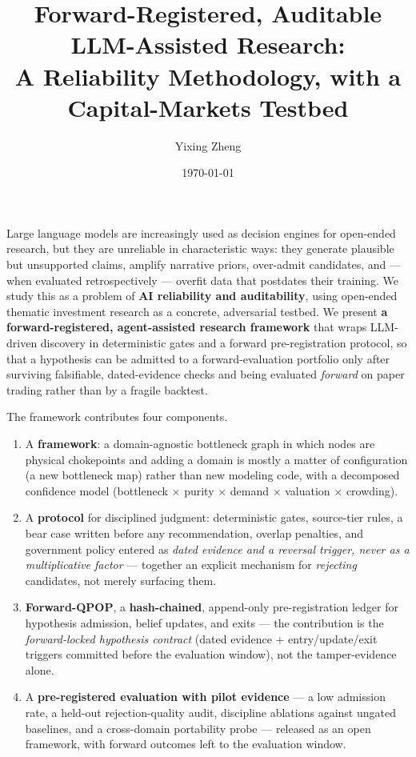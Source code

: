 \documentclass[11pt]{article}
\title{Forward-Registered, Auditable LLM-Assisted Research:\\
A Reliability Methodology, with a Capital-Markets Testbed}
\author{Yixing Zheng}
\date{\today}
\renewenvironment{abstract}{\begin{center}\bfseries\abstractname\end{center}\par\noindent\ignorespaces}{\par\medskip}
\begin{document}
\maketitle

\begin{abstract}
Large language models are increasingly used as decision engines for open-ended research, but they
are unreliable in characteristic ways: they generate plausible but unsupported claims, amplify
narrative priors, over-admit candidates, and --- when evaluated retrospectively --- overfit data
that postdates their training. We study this as a problem of \textbf{AI reliability and
auditability}, using open-ended thematic investment research as a concrete, adversarial testbed. We
present \textbf{a forward-registered, agent-assisted research framework} that wraps LLM-driven
discovery in deterministic gates and a forward pre-registration protocol, so that a hypothesis can
be admitted to a forward-evaluation portfolio only after surviving falsifiable, dated-evidence
checks and being evaluated \emph{forward} on paper trading rather than by a fragile backtest.

The framework contributes four components.
\begin{enumerate}
  \item A \textbf{framework}: a domain-agnostic bottleneck graph
    in which nodes are physical chokepoints and adding a domain is mostly a matter of configuration
    (a new bottleneck map) rather than new modeling code, with
    a decomposed confidence model (bottleneck $\times$ purity $\times$ demand $\times$ valuation $\times$ crowding).
  \item A \textbf{protocol} for disciplined judgment: deterministic gates, source-tier rules, a bear case written
    before any recommendation, overlap penalties, and government policy entered as \emph{dated evidence and a
    reversal trigger, never as a multiplicative factor} --- together an explicit mechanism for \emph{rejecting}
    candidates, not merely surfacing them.
  \item \textbf{Forward-QPOP}, a \textbf{hash-chained}, append-only
    pre-registration ledger for hypothesis admission, belief updates, and exits --- the contribution is
    the \emph{forward-locked hypothesis contract} (dated evidence + entry/update/exit triggers committed
    before the evaluation window), not the tamper-evidence alone.
  \item A \textbf{pre-registered evaluation with pilot evidence} --- a low admission rate, a held-out
    rejection-quality audit, discipline ablations against ungated baselines, and a cross-domain portability
    probe --- released as an open framework, with forward outcomes left to the evaluation window.
\end{enumerate}


\end{abstract}
\end{document}

